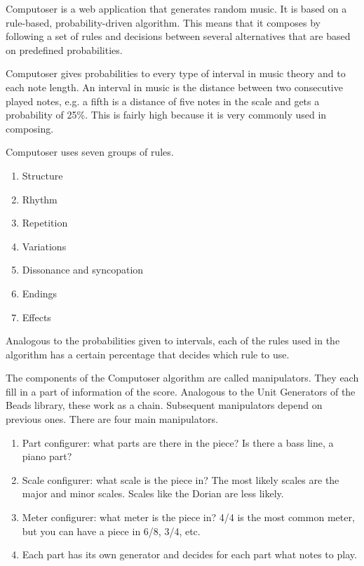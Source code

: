\documentclass[12pt]{article}
\begin{document}
Computoser is a web application that generates random music. It is based on a rule-based, probability-driven algorithm. This means that it composes by following a set of rules and decisions between several alternatives that are based on predefined probabilities.
\newline

Computoser gives probabilities to every type of interval in music theory and to each note length.
An interval in music is the distance between two consecutive played notes, e.g. a fifth is a distance of five notes in the scale and gets a probability of 25\%. This is fairly high because it is very commonly used in composing.
\newline

Computoser uses seven groups of rules.
\begin{enumerate}
\item Structure
\item Rhythm
\item Repetition
\item Variations
\item Dissonance and syncopation
\item Endings
\item Effects
\end{enumerate}

Analogous to the probabilities given to intervals, each of the rules used in the algorithm has a certain percentage that decides which rule to use.
\newline

The components of the Computoser algorithm are called manipulators. They each fill in a part of information of the score. Analogous to the Unit Generators of the Beads library, these work as a chain. Subsequent manipulators depend on previous ones. There are four main manipulators.

\begin{enumerate}
\item Part configurer: what parts are there in the piece? Is there a bass line, a piano part?
\item Scale configurer: what scale is the piece in? The most likely scales are the major and minor scales. Scales like the Dorian are less likely.
\item Meter configurer: what meter is the piece in? 4/4 is the most common meter, but you can have a piece in 6/8, 3/4, etc.
\item Each part has its own generator and decides for each part what notes to play.
\end{enumerate}
 
\end{document}
